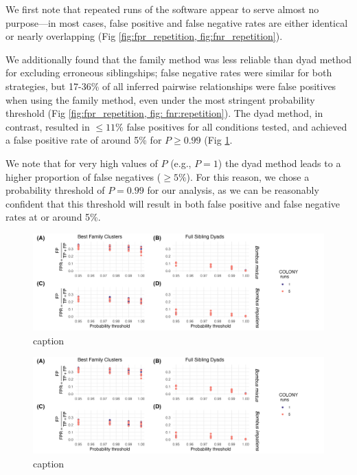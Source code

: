 \documentclass[12pt]{article}
\begin{document}
We first note that repeated runs of the software appear to serve almost no purpose---in most cases, false positive and false negative rates are either identical or nearly overlapping (Fig \ref{fig:fpr_repetition, fig:fnr_repetition}).

We additionally found that the family method was less reliable than dyad method for excluding erroneous siblingships; false negative rates were similar for both strategies, but 17-36\% of all inferred pairwise relationships were false positives when using the family method, even under the most stringent probability threshold (Fig \ref{fig:fpr_repetition, fig: fnr:repetition}). The dyad method, in contrast, resulted in $\le 11\%$ false positives for all conditions tested, and achieved a false positive rate of around 5\% for $P \ge 0.99$ (Fig \ref{fig:fpr_repetition}. 

We note that for very high values of $P$ (e.g., $P = 1$) the dyad method leads to a higher proportion of false negatives ($\ge 5\%$). For this reason, we chose a probability threshold of $P = 0.99$ for our analysis, as we can be reasonably confident that this threshold will result in both false positive and false negative rates at or around 5\%.

\begin{figure}[H]
    \centering
    \includegraphics[width=\linewidth]{appendix_figures/fpr_repetition.jpg}
    \caption{caption}
    \label{fig:fpr_repetition}
\end{figure}

\begin{figure}[H]
    \centering
    \includegraphics[width=\linewidth]{appendix_figures/fnr_repetition.jpg}
    \caption{caption}
    \label{fig:fnr_repetition}
\end{figure}
\end{document}
